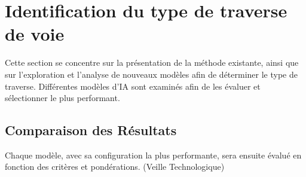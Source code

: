 \section{Identification du type de traverse de voie}

Cette section se concentre sur la présentation de la méthode existante, ainsi que sur l'exploration et l'analyse de nouveaux modèles afin de déterminer le type de traverse. Différentes modèles d'IA sont examinés afin de les évaluer et sélectionner le plus performant. 






\subsection{Comparaison des Résultats}




\noindent Chaque modèle, avec sa configuration la plus performante, sera ensuite évalué en fonction des critères et pondérations. (Veille Technologique)

